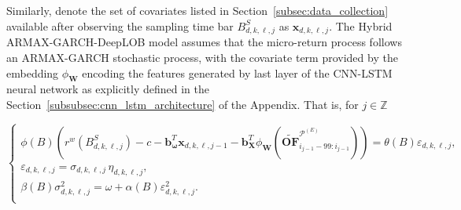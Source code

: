 \documentclass[10pt,a4paper,oneside]{article}
\newcommand{\Z}{\mathbb{Z}}
\providecommand{\DIFaddbegin}{} %
\providecommand{\DIFaddend}{} %
\providecommand{\DIFdelbegin}{} %
\providecommand{\DIFdelend}{} %
\newcommand{\DIFscaledelfig}{0.5}
\newlength{\DIFdelgraphicswidth} %
\newlength{\DIFdelgraphicsheight} %
\newcommand{\DIFaddincludegraphics}[2][]{{\color{blue}\fbox{\DIFOincludegraphics[#1]{#2}}}} %
\newcommand{\DIFdelincludegraphics}[2][]{%
\sbox{\DIFdelgraphicsbox}{\DIFOincludegraphics[#1]{#2}}%
\settoboxwidth{\DIFdelgraphicswidth}{\DIFdelgraphicsbox} %
\settoboxtotalheight{\DIFdelgraphicsheight}{\DIFdelgraphicsbox} %
\scalebox{\DIFscaledelfig}{%
\parbox[b]{\DIFdelgraphicswidth}{\usebox{\DIFdelgraphicsbox}\\[-\baselineskip] \rule{\DIFdelgraphicswidth}{0em}}\llap{\resizebox{\DIFdelgraphicswidth}{\DIFdelgraphicsheight}{%
\setlength{\unitlength}{\DIFdelgraphicswidth}%
\begin{picture}(1,1)%
\thicklines\linethickness{2pt} %
{\color[rgb]{1,0,0}\put(0,0){\framebox(1,1){}}}%
{\color[rgb]{1,0,0}\put(0,0){\line( 1,1){1}}}%
{\color[rgb]{1,0,0}\put(0,1){\line(1,-1){1}}}%
\end{picture}%
}\hspace*{3pt}}} %
} %
\DeclareRobustCommand{\DIFaddbegin}{\DIFOaddbegin \let\includegraphics\DIFaddincludegraphics} %
\DeclareRobustCommand{\DIFaddend}{\DIFOaddend \let\includegraphics\DIFOincludegraphics} %
\DeclareRobustCommand{\DIFdelbegin}{\DIFOdelbegin \let\includegraphics\DIFdelincludegraphics} %
\DeclareRobustCommand{\DIFdelend}{\DIFOaddend \let\includegraphics\DIFOincludegraphics} %
\begin{document}
Similarly, denote the set of covariates listed in Section~\ref{subsec:data_collection} available after observing the sampling time bar $B^S_{d, k, \ell, j}$ as $\mathbf{x}_{d, k, \ell, j}$. The Hybrid ARMAX-GARCH-DeepLOB model assumes that the micro-return process follows an ARMAX-GARCH stochastic process, with the covariate term provided by the embedding $\phi_{\mathbf{W}}$ encoding the features generated by last layer of the CNN-LSTM neural network as explicitly defined in the Section~\ref{subsubsec:cnn_lstm_architecture} of the Appendix. That is, for $j \in \Z$

\begin{equation}
    \DIFdelbegin %
\DIFdelend \DIFaddbegin \begin{cases}
        \phi(B) \left( r^w \left( B^S_{d, k, \ell, j} \right) - c - \mathbf{b}_{\boldsymbol{\omega}}^T \mathbf{x}_{d, k, \ell, j - 1} - \mathbf{b}^T_{\mathbf{X}}\phi_{\mathbf{W}} \left( \widetilde{\mathbf{OF}}^{\mathcal{P}^{(E)}}_{i_{j - 1} - 99:i_{j - 1}} \right) \right) = \theta(B) \varepsilon_{d, k, \ell, j}, \\[6pt]
        \varepsilon_{d, k, \ell, j} = \sigma_{d, k, \ell, j} \,\eta_{d, k, \ell, j},                                                                                                                                                                                                                                      \\[6pt]
        \beta(B) \sigma_{d, k, \ell, j}^2 = \omega + \alpha(B) \varepsilon^2_{d, k, \ell, j}.                                                                                                                                                                                                                             \\
    \end{cases}\DIFaddend 
    \label{eq:hybrid_armax_garch}
\end{equation}
\end{document}
